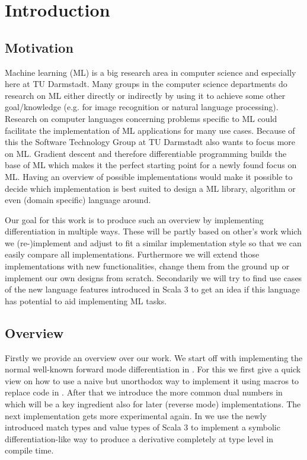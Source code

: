 \chapter{Introduction}

\section{Motivation}
Machine learning (ML) is a big research area in computer science and especially here at TU Darmstadt. Many groups in the computer science departments do research on ML either directly or indirectly by using it to achieve some other goal/knowledge (e.g. for image recognition or natural language processing). Research on computer languages concerning problems specific to ML could facilitate the implementation of ML applications for many use cases. Because of this the Software Technology Group at TU Darmstadt also wants to focus more on ML. Gradient descent and therefore differentiable programming builds the base of ML which makes it the perfect starting point for a newly found focus on ML. Having an overview of possible implementations would make it possible to decide which implementation is best suited to design a ML library, algorithm or even (domain specific) language around. 

Our goal for this work is to produce such an overview by implementing differentiation in multiple ways. These will be partly based on other's work which we (re-)implement and adjust to fit a similar implementation style so that we can easily compare all implementations. Furthermore we will extend those implementations with new functionalities, change them from the ground up or implement our own designs from scratch. Secondarily we will try to find use cases of the new language features introduced in Scala 3 to get an idea if this language has potential to aid implementing ML tasks.

\section{Overview}
Firstly we provide an overview over our work. We start off with implementing the normal well-known forward mode differentiation in . For this we first give a quick view on how to use a naive but unorthodox way to implement it using macros to replace code in . After that we introduce the more common dual numbers in  which will be a key ingredient also for later (reverse mode) implementations. The next implementation gets more experimental again. In  we use the newly introduced match types and value types of Scala 3 to implement a symbolic differentiation-like way to produce a derivative completely at type level in compile time.


